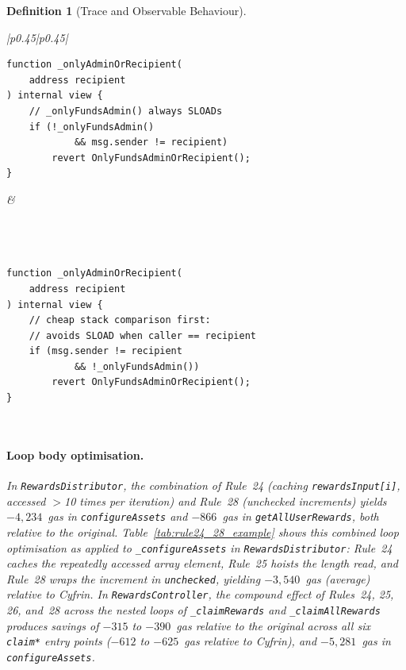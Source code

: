 \documentclass[manuscript,screen,review]{acmart}
\newtheorem{definition}{Definition}
\begin{document}
\begin{definition}[Trace and Observable Behaviour]
\begin{table}[htb]
\begin{footnotesize}
\begin{tabular}{|p{}|p{}|}
\begin{verbatim}
function _onlyAdminOrRecipient(
    address recipient
) internal view {
    // _onlyFundsAdmin() always SLOADs
    if (!_onlyFundsAdmin()
            && msg.sender != recipient)
        revert OnlyFundsAdminOrRecipient();
}
\end{verbatim}
&
\vspace*{-0.5cm}
\begin{verbatim}



function _onlyAdminOrRecipient(
    address recipient
) internal view {
    // cheap stack comparison first:
    // avoids SLOAD when caller == recipient
    if (msg.sender != recipient
            && !_onlyFundsAdmin())
        revert OnlyFundsAdminOrRecipient();
}
\end{verbatim}
\\ \hline
\end{tabular}
\end{footnotesize}
\end{table}

\paragraph{Loop body optimisation.}
In \texttt{RewardsDistributor}, the combination of Rule~24 (caching \texttt{rewardsInput[i]}, accessed $>$10 times per iteration) and Rule~28 (unchecked increments) yields $-4{,}234$~gas in \texttt{configureAssets} and $-866$~gas in \texttt{getAllUserRewards}, both relative to the original. Table~\ref{tab:rule24_28_example} shows this combined loop optimisation as applied to \texttt{\_configureAssets} in \texttt{RewardsDistributor}: Rule~24 caches the repeatedly accessed array element, Rule~25 hoists the length read, and Rule~28 wraps the increment in \texttt{unchecked}, yielding $-3{,}540$~gas (average) relative to Cyfrin. In \texttt{RewardsController}, the compound effect of Rules~24, 25, 26, and~28 across the nested loops of \texttt{\_claimRewards} and \texttt{\_claimAllRewards} produces savings of $-315$ to $-390$~gas relative to the original across all six \texttt{claim*} entry points ($-612$ to $-625$~gas relative to Cyfrin), and $-5{,}281$~gas in \texttt{configureAssets}.


\end{definition}
\end{document}
